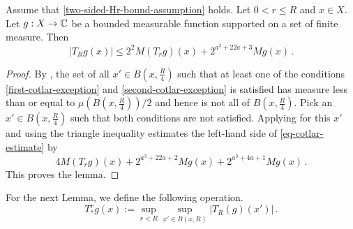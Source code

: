 \begin{lemma}
\label{Cotlar-estimate}
\leanok
{}
Assume that \eqref{two-sided-Hr-bound-assumption} holds.
Let $0<r\le R$ and  $x\in X$. Let $g:X\to\mathbb{C}$ be a bounded measurable function supported on a set of finite measure. Then
\begin{equation}\label{eq-cotlar-estimate}
|T_Rg(x)| \le 2^{2}M(T_rg)(x)+ 2^{a^3+22a+3} Mg(x)
\, .
\end{equation}
\end{lemma}


\begin{proof}
\leanok
By , the set of all $x'\in B(x,\frac {R} 4)$
such that at least one of the conditions
\eqref{first-cotlar-exception} and
\eqref{second-cotlar-exception} is satisfied has measure less than or equal to $\mu(B(x,\frac{R}{4}))/2$ and hence is not all of $B(x,\frac {R} 4)$.
Pick an $x'\in B(x,\frac {R} 4)$ such that both conditions are not satisfied.
Applying  for this $x'$ and using the triangle inequality
estimates the left-hand side of \eqref{eq-cotlar-estimate}
by
\begin{equation}
    4 M(T_rg)(x) + 2^{a^3 + 22a + 2} Mg(x) + 2^{a^3 + 4a + 1} Mg(x)\, .
\end{equation}
This proves the lemma.
\end{proof}

For the next Lemma, we define the following operation.
\begin{equation}\label{eq-simple--nontangential}
    T_{*}^r g(x):=\sup_{r<R}\sup_{x'\in B(x,R)} |T_R(g)(x')| \, .
\end{equation}


